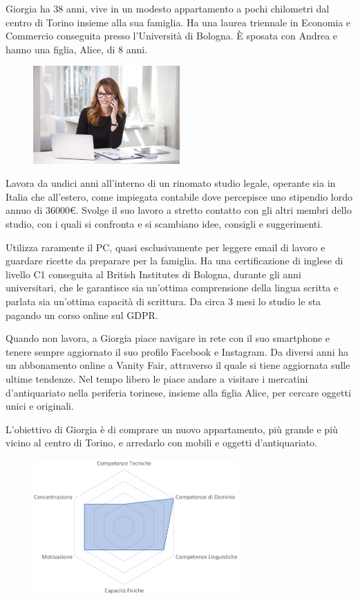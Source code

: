 \documentclass[12pt,italian,]{report}
\begin{document}
Giorgia ha 38 anni, vive in un modesto appartamento a pochi chilometri
dal centro di Torino insieme alla sua famiglia. Ha una laurea triennale
in Economia e Commercio conseguita presso l'Università di Bologna. È
sposata con Andrea e hanno una figlia, Alice, di 8 anni.

\begin{figure}[h]
\centering
\includegraphics[width=0.5\textwidth,height=\textheight]{img/giorgia.jpg}
\end{figure}

Lavora da undici anni all'interno di un rinomato studio legale, operante
sia in Italia che all'estero, come impiegata contabile dove percepisce
uno stipendio lordo annuo di 36000€. Svolge il suo lavoro a stretto
contatto con gli altri membri dello studio, con i quali si confronta e
si scambiano idee, consigli e suggerimenti.

Utilizza raramente il PC, quasi esclusivamente per leggere email di
lavoro e guardare ricette da preparare per la famiglia. Ha una
certificazione di inglese di livello C1 conseguita al British Institutes
di Bologna, durante gli anni universitari, che le garantisce sia
un'ottima comprensione della lingua scritta e parlata sia un'ottima
capacità di scrittura. Da circa 3 mesi lo studio le sta pagando un corso
online sul GDPR.

Quando non lavora, a Giorgia piace navigare in rete con il suo
smartphone e tenere sempre aggiornato il suo profilo Facebook e
Instagram. Da diversi anni ha un abbonamento online a Vanity Fair,
attraverso il quale si tiene aggiornata sulle ultime tendenze. Nel tempo
libero le piace andare a visitare i mercatini d'antiquariato nella
periferia torinese, insieme alla figlia Alice, per cercare oggetti unici
e originali.

L'obiettivo di Giorgia è di comprare un nuovo appartamento, più grande e
più vicino al centro di Torino, e arredarlo con mobili e oggetti
d'antiquariato.

\begin{figure}[h]
\centering
\includegraphics[width=0.7\textwidth,height=\textheight]{img/giorgia_competenze.png}
\end{figure}
\end{document}
